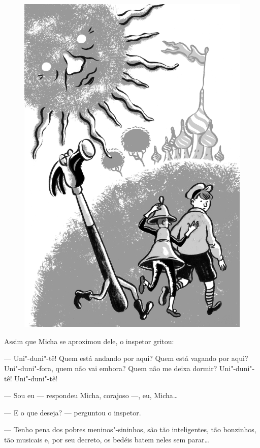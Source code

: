 \begin{figure}%
\vspace*{-1.5cm}
\hspace*{-2cm}\includegraphics[width=140mm]{./imgs/cena2.jpg}
\end{figure}

Assim que Micha se aproximou dele, o inspetor gritou:

--- Uni"-duni"-tê! Quem está andando por aqui? Quem está vagando por aqui?
Uni"-duni"-fora, quem não vai embora? Quem não me deixa dormir?
Uni"-duni"-tê! Uni"-duni"-tê!

--- Sou eu --- respondeu Micha, corajoso ---, eu, Micha\ldots{}

--- E o que deseja? --- perguntou o inspetor.

--- Tenho pena dos pobres meninos"-sininhos, são tão inteligentes, tão
bonzinhos, tão musicais e, por seu decreto, os bedéis batem neles sem
parar\ldots{}

